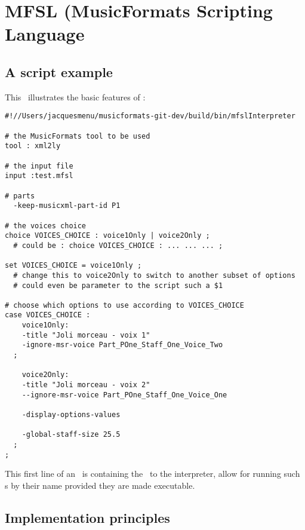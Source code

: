
\chapter{MFSL (MusicFormats Scripting Language}

\section{A script example}

This \script\ illustrates the basic features of \mfslLang:
\begin{lstlisting}[language=MFSL]
#!//Users/jacquesmenu/musicformats-git-dev/build/bin/mfslInterpreter

# the MusicFormats tool to be used
tool : xml2ly

# the input file
input :test.mfsl

# parts
  -keep-musicxml-part-id P1

# the voices choice
choice VOICES_CHOICE : voice1Only | voice2Only ;
  # could be : choice VOICES_CHOICE : ... ... ... ;

set VOICES_CHOICE = voice1Only ;
  # change this to voice2Only to switch to another subset of options
  # could even be parameter to the script such a $1

# choose which options to use according to VOICES_CHOICE
case VOICES_CHOICE :
	voice1Only:
    -title "Joli morceau - voix 1"
    -ignore-msr-voice Part_POne_Staff_One_Voice_Two
  ;

	voice2Only:
    -title "Joli morceau - voix 2"
    --ignore-msr-voice Part_POne_Staff_One_Voice_One

    -display-options-values

    -global-staff-size 25.5
  ;
;
\end{lstlisting}

This first line of an \mfslLang\ \script is  containing the \filePath\ to the interpreter, allow for running such \script s by their name provided they are made executable.


\section{Implementation principles}

